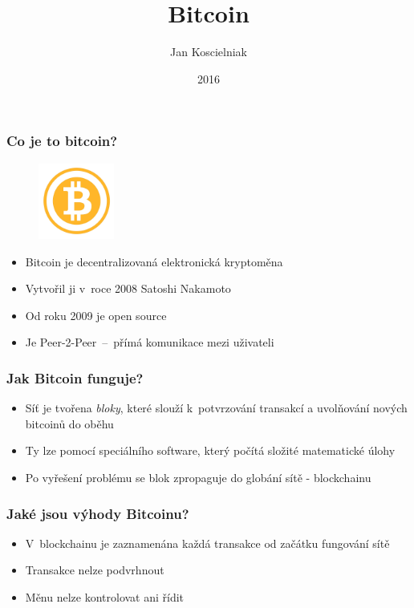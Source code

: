 \documentclass{beamer}
\title{Bitcoin}
\author{Jan Koscielniak}
\institute{VUT FIT}
\date{2016}
\begin{document}
 
\frame{\titlepage}
 
\begin{frame}
\frametitle{Co je to bitcoin?}
\begin{figure}[h]
\includegraphics[height=2.5cm]{bitcoinlogo}
\centering
\end{figure}
\begin{itemize}
\item Bitcoin je decentralizovaná elektronická kryptoměna
\item Vytvořil ji v~roce 2008 Satoshi Nakamoto
\item Od roku 2009 je open source
\item Je Peer-2-Peer \,--\, přímá komunikace mezi uživateli
\end{itemize}
\end{frame}

\begin{frame}
\frametitle{Jak Bitcoin funguje?}
\begin{itemize}
\item Síť je tvořena \emph{bloky}, které slouží k~potvrzování transakcí a uvolňování nových bitcoinů do oběhu
\item Ty lze  pomocí speciálního software, který počítá složité matematické úlohy
\item Po vyřešení problému se blok zpropaguje do globání sítě - blockchainu
\end{itemize}
\end{frame} 

\begin{frame}
\frametitle{Jaké jsou výhody Bitcoinu?}
\begin{itemize}
\item V~blockchainu je zaznamenána každá transakce od začátku fungování sítě
\item Transakce nelze podvrhnout
\item Měnu nelze kontrolovat ani řídit
\end{itemize}
\end{frame}
\end{document}
